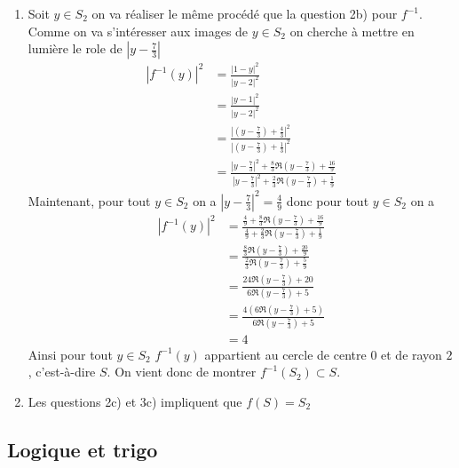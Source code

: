 \begin{correction}
\begin{enumerate}
\begin{enumerate}
\item Soit $y\in S_2$ on va réaliser le même procédé que la question 2b) pour $f^{-1}$. Comme on va s'intéresser aux images de $y \in S_2$ on cherche à mettre en lumière le role de $|y-\frac{7}{3}|$
\begin{align*}
\left|f^{-1} (y) \right|^2 &=\frac{|1-y|^2}{|y-2|^2}\\
									&=\frac{|y-1|^2 }{|y-2|^2}	\\
									&=\frac{|(y-\frac{7}{3}) +\frac{4}{3}|^2 }{|(y-\frac{7}{3}) +\frac{1}{3}|^2}	\\
									&=\frac{|y-\frac{7}{3}|^2 +\frac{8}{3}\Re( y-\frac{7}{3}) + \frac{16}{9} }{|y-\frac{7}{3}|^2 +\frac{2}{3}\Re( y-\frac{7}{3}) + \frac{1}{9} }
\end{align*}
Maintenant, pour tout $y\in S_2$ on a $|y-\frac{7}{3}|^2 =\frac{4}{9}$ donc pour tout $y\in S_2$ on a 
\begin{align*}
\left|f^{-1} (y) \right|^2& = 
\frac{\frac{4}{9}+\frac{8}{3}\Re( y-\frac{7}{3}) + \frac{16}{9} }{\frac{4}{9} +\frac{2}{3}\Re( y-\frac{7}{3}) + \frac{1}{9} }\\
& = 
\frac{\frac{8}{3}\Re( y-\frac{7}{3}) + \frac{20}{9} }{\frac{2}{3}\Re( y-\frac{7}{3}) + \frac{5}{9} }\\
& = 
\frac{24\Re( y-\frac{7}{3}) + 20 }{6\Re( y-\frac{7}{3}) + 5 }\\
& = 
\frac{4(6\Re( y-\frac{7}{3}) + 5) }{6\Re( y-\frac{7}{3}) + 5 }\\
&=4
\end{align*}
Ainsi  pour tout $y\in S_2$  $f^{-1}(y)$ appartient au cercle de centre $0$ et de rayon $2$, c'est-à-dire $S$. 
On vient donc de montrer $f^{-1} (S_2)\subset S$. 
\item Les questions 2c) et 3c) impliquent que $f(S) =S_2$
\end{enumerate}
\end{enumerate}
\end{correction}






\subsection{Logique et trigo}

